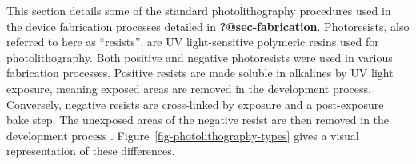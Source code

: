 \documentclass[
  a4paper,
]{scrbook}
\begin{document}
This section details some of the standard photolithography procedures
used in the device fabrication processes detailed in
\textbf{?@sec-fabrication}. Photoresists, also referred to here as
``resists'', are UV light-sensitive polymeric resins used for
photolithography. Both positive and negative photoresists were used in
various fabrication processes. Positive resists are made soluble in
alkalines by UV light exposure, meaning exposed areas are removed in the
development process. Conversely, negative resists are cross-linked by
exposure and a post-exposure bake step. The unexposed areas of the
negative resist are then removed in the development process
\autocite{Microchemicals}. Figure~\ref{fig-photolithography-types} gives
a visual representation of these differences.

\begin{figure}

\begin{minipage}[t]{0.47\linewidth}

{\centering 


}

\end{minipage}%
%
\begin{minipage}[t]{0.05\linewidth}

{\centering 

~

}

\end{minipage}%
%
\begin{minipage}[t]{0.47\linewidth}

{\centering 

}
\end{minipage}
\end{figure}
\end{document}

